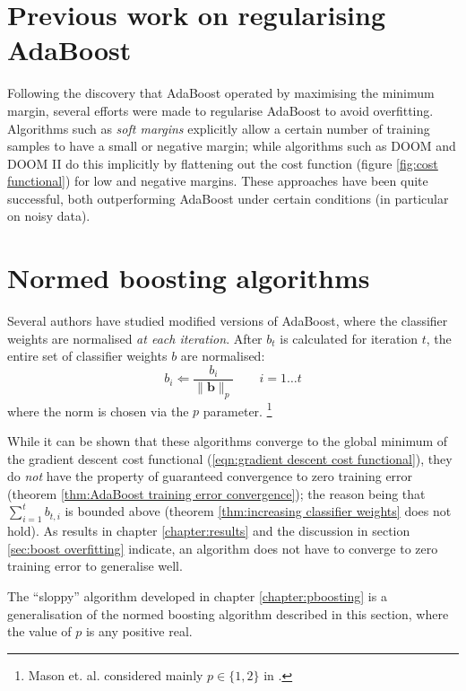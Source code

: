 \section{Previous work on regularising AdaBoost}

Following the discovery that AdaBoost operated by maximising the
minimum margin, several efforts were made to regularise AdaBoost to
avoid overfitting.  Algorithms such as \emph{soft margins}
\cite{Ratsch98} explicitly allow a certain number of training samples
to have a small or negative margin; while algorithms such as DOOM and
DOOM II \cite{Mason99a, Mason99b} do this implicitly by flattening out
the cost function (figure \ref{fig:cost functional}) for low and
negative margins.  These approaches have been quite successful, both
outperforming AdaBoost under certain conditions (in particular on
noisy data).


\section{Normed boosting algorithms}

Several authors \cite{Mason99a, Breiman97} have studied modified
versions of AdaBoost, where the classifier weights are
normalised \emph{at each iteration}.  After $b_t$ is calculated for
iteration $t$, the entire set of classifier weights $b$ are
normalised:
%
\begin{equation}
b_{i} \Leftarrow \frac{b_i}{\| \mathbf{b} \|_p} \qquad  i=1
\ldots t
\end{equation}
%
where the norm is chosen via the $p$ parameter.%
\footnote{Mason et. al. considered mainly $p \in \{ 1,2 \}$ in
\cite{Mason99a}.}

While it can be shown that these algorithms converge to the global
minimum of the gradient descent cost functional (\ref{eqn:gradient
descent cost functional}), they do \emph{not} have the property of
guaranteed convergence to zero training error (theorem
\ref{thm:AdaBoost training error convergence}); the reason being that 
$\sum_{i=1}^t b_{t,i}$ is bounded above (theorem \ref{thm:increasing
classifier weights} does not hold).  As results in chapter
\ref{chapter:results} and the discussion in section \ref{sec:boost
overfitting} indicate, an algorithm does not have to converge to zero
training error to generalise well.

The ``sloppy'' algorithm developed in chapter \ref{chapter:pboosting}
is a generalisation of the normed boosting algorithm described in this
section, where the value of $p$ is any positive real.





